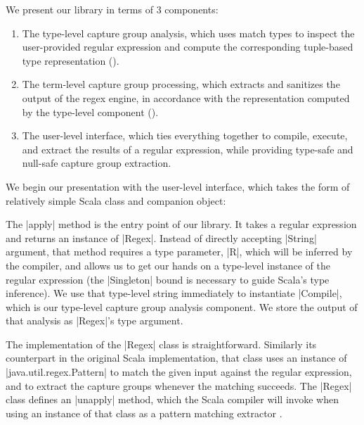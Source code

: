 We present our library in terms of 3 components:

\begin{enumerate}
  \item The type-level capture group analysis, which uses match types to inspect the user-provided regular expression and compute the corresponding tuple-based type representation ().

  \item The term-level capture group processing, which extracts and sanitizes the output of the regex engine, in accordance with the representation computed by the type-level component ().

  \item The user-level interface, which ties everything together to compile, execute, and extract the results of a regular expression, while providing type-safe and null-safe capture group extraction.
\end{enumerate}

We begin our presentation with the user-level interface, which takes the form of relatively simple Scala class and companion object:

\regexUserLevel
%

The |apply| method is the entry point of our library.
It takes a regular expression and returns an instance of |Regex|.
Instead of directly accepting |String| argument, that method requires a type parameter, |R|, which will be inferred by the compiler, and allows us to get our hands on a type-level instance of the regular expression (the |Singleton| bound is necessary to guide Scala's type inference).
We use that type-level string immediately to instantiate |Compile|, which is our type-level capture group analysis component.
We store the output of that analysis as |Regex|'s type argument.

The implementation of the |Regex| class is straightforward.
Similarly its counterpart in the original Scala implementation, that class uses an instance of |java.util.regex.Pattern| to match the given input against the regular expression, and to extract the capture groups whenever the matching succeeds.
The |Regex| class defines an |unapply| method, which the Scala compiler will invoke when using an instance of that class as a pattern matching extractor \citep{emir2007matching}.

